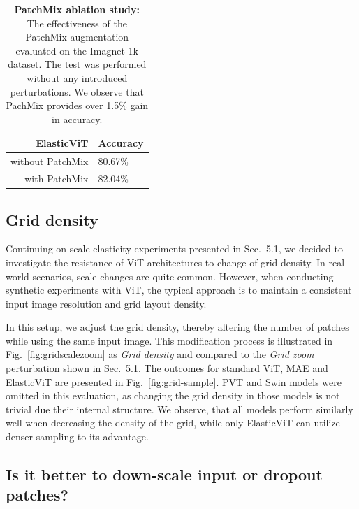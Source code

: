 \documentclass[10pt,twocolumn,letterpaper]{article}
\newcommand{\ours}[0]{ElasticViT\xspace}
\begin{document}
\begin{table}[t]
    \centering
    \begin{tabular}{rl}
    \toprule
        ElasticViT & Accuracy \\
        \midrule
        without PatchMix & 80.67\% \\
        with PatchMix & 82.04\% \\
        \bottomrule
    \end{tabular}
    \caption{\textbf{PatchMix ablation study:} The effectiveness of the PatchMix augmentation evaluated on the Imagnet-1k dataset. The test was performed without any introduced perturbations. We observe that PachMix provides over 1.5\% gain in accuracy.}
    \label{tab:patchmix_ablation}
\end{table}

\subsection{Grid density}



Continuing on scale elasticity experiments presented in Sec.~5.1, we decided to investigate the resistance of ViT architectures to change of grid density. In real-world scenarios, scale changes are quite common. However, when conducting synthetic experiments with ViT, the typical approach is to maintain a consistent input image resolution and grid layout density.



In this setup, we adjust the grid density, thereby altering the number of patches while using the same input image. This modification process is illustrated in Fig.~\ref{fig:gridscalezoom} as \textit{Grid density} and compared to the \textit{Grid zoom} perturbation shown in Sec.~5.1. The outcomes for standard ViT, MAE and \ours{} are presented in Fig.~\ref{fig:grid-sample}. PVT and Swin models were omitted in this evaluation, as changing the grid density in those models is not trivial due their internal structure. We observe, that all models perform similarly well when decreasing the density of the grid, while only \ours{} can utilize denser sampling to its advantage.


\subsection{Is it better to down-scale input or dropout patches?}
\end{document}
